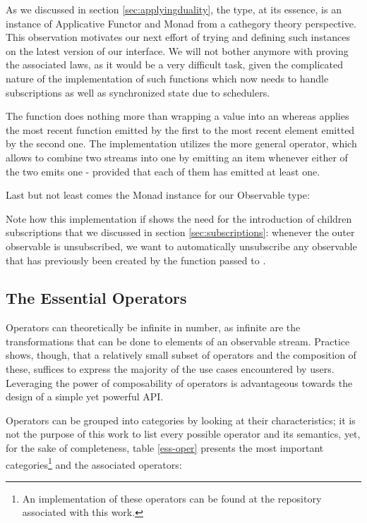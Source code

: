 
As we discussed in section \ref{sec:applyingduality}, the  type, at its essence, is an instance of Applicative Functor and Monad from a cathegory theory perspective. This observation motivates our next effort of trying and defining such instances on the latest version of our interface. We will not bother anymore with proving the associated laws, as it would be a very difficult task, given the complicated nature of the implementation of such functions which now needs to handle subscriptions as well as synchronized state due to schedulers.


The function  does nothing more than wrapping a value into an  whereas \code{(<*>)} applies the most recent function emitted by the first  to the most recent element emitted by the second one. The implementation utilizes the more general  operator, which allows to combine two streams into one by emitting an item whenever either of the two emits one - provided that each of them has emitted at least one. 

Last but not least comes the Monad instance for our Observable type:


Note how this implementation if \code{(>>=)} shows the need for the introduction of children subscriptions that we discussed in section \ref{sec:subscriptions}: whenever the outer observable is unsubscribed, we want to automatically unsubscribe any observable that has previously been created by the function passed to \code{(>>=)}.

\subsection{The Essential Operators}
Operators can theoretically be infinite in number, as infinite are the transformations that can be done to elements of an observable stream. Practice shows, though, that a relatively small subset of operators and the composition of these, suffices to express the majority of the use cases encountered by users. Leveraging the power of composability of operators is advantageous towards the design of a simple yet powerful API.

Operators can be grouped into categories by looking at their characteristics; it is not the purpose of this work to list every possible operator and its semantics, yet, for the sake of completeness, table \ref{ess-oper} presents the most important categories\footnote{An implementation of these operators can be found at the repository associated with this work.} and the associated operators:

